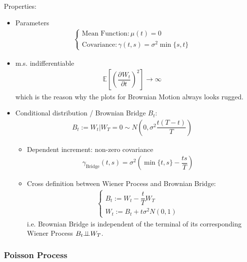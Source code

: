 Properties:
\begin{itemize}[topsep=2pt,itemsep=0pt]
        \item Parameters
        \begin{align}
            \begin{cases}
                \text{Mean Function}:\mu (t)=0\\
                \text{Covariance}:\gamma (t,s)=\sigma ^2 \min\{s,t\} 
            \end{cases} 
        \end{align}
        \item m.s. indifferentiable
        \begin{align}
            \mathbb{E}\left[ \left(\dfrac{\partial^{} W_t}{\partial t^{}}\right)^2 \right]\to \infty  
        \end{align}
        which is the reason why the plots for Brownian Motion always looks rugged.
        \item Conditional distribution / Brownian Bridge $ B_t $:
        \begin{align}
            B_t := W_t|W_T=0 \sim N(0,\sigma ^2\dfrac{t(T-t)}{T})
        \end{align}
        \begin{itemize}[topsep=2pt,itemsep=0pt]
            \item Dependent increment: non-zero covariance
        \begin{align}
            \gamma_\mathrm{Bridge}  (t,s) = \sigma ^2\left(\min\{t,s\}-\dfrac{ts}{T}\right)
        \end{align}
            \item Cross definition between Wiener Process and Brownian Bridge:
            \begin{align}
                \begin{cases}
                    B_t:=W_t-\dfrac{t}{T}W_T\\
                    W_t:=B_t+t \sigma ^2 N(0,1) 
                \end{cases}
            \end{align}
            i.e. Brownian Bridge is independent of the terminal of its corresponding Wiener Process $ B_t\bot\!\!\!\bot W_T $.
        \end{itemize}
\end{itemize}

\subsubsection{Poisson Process}\label{SubSubSectionPoissonProcess}
\hypertarget{PoissonProcess}{}

